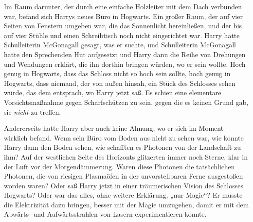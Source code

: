 Im Raum darunter, der durch eine einfache Holzleiter mit dem Dach verbunden war, befand sich Harrys neues Büro in Hogwarts. Ein großer Raum, der auf vier Seiten von Fenstern umgeben war, die das Sonnenlicht hereinließen, und der bis auf vier Stühle und einen Schreibtisch noch nicht eingerichtet war. Harry hatte Schulleiterin McGonagall gesagt, was er suchte, und Schulleiterin McGonagall hatte den Sprechenden Hut aufgesetzt und Harry dann die Reihe von Drehungen und Wendungen erklärt, die ihn dorthin bringen würden, wo er sein wollte. Hoch genug in Hogwarts, dass das Schloss nicht so hoch sein sollte, hoch genug in Hogwarts, dass niemand, der von außen hinsah, ein Stück des Schlosses sehen würde, das dem entsprach, wo Harry jetzt saß. Es schien eine elementare Vorsichtsmaßnahme gegen Scharfschützen zu sein, gegen die es keinen Grund gab, sie \emph{nicht} zu treffen.

Andererseits hatte Harry aber auch keine Ahnung, wo er sich im Moment wirklich befand. Wenn sein Büro vom Boden aus nicht zu sehen war, wie konnte Harry dann den Boden sehen, wie schafften es Photonen von der Landschaft zu ihm?
Auf der westlichen Seite des Horizonts glitzerten immer noch Sterne, klar in der Luft vor der Morgendämmerung. Waren diese Photonen die tatsächlichen Photonen, die von riesigen Plasmaöfen in der unvorstellbaren Ferne ausgestoßen worden waren? Oder saß Harry jetzt in einer träumerischen Vision des Schlosses Hogwarts? Oder war das alles, ohne weitere Erklärung, „nur Magie“? Er musste die Elektrizität dazu bringen, besser mit der Magie umzugehen, damit er mit dem Abwärts- und Aufwärtsstrahlen von Lasern experimentieren konnte.

